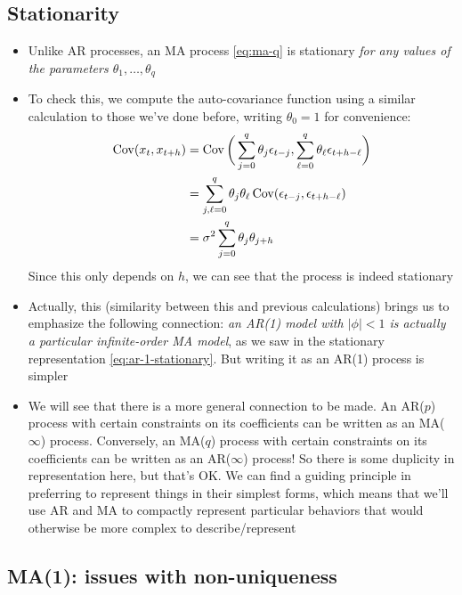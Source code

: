 \documentclass{article}
\begin{document}
\subsection{Stationarity}

\begin{itemize}
\item Unlike AR processes, an MA process \eqref{eq:ma-q} is stationary \emph{for
    any values of the parameters $\theta_1,\dots,\theta_q$}

\item To check this, we compute the auto-covariance function using a similar
  calculation to those we've done before, writing $\theta_0 = 1$ for
  convenience:  
  \begin{align}
  \nonumber
  \operatorname{Cov}(x_t, x_{t+h}) &= \operatorname{Cov}\bigg( \sum_{j=0}^q \theta_j \epsilon_{t-j}, 
  \sum_{\ell=0}^q \theta_\ell \epsilon_{t+h-\ell} \bigg) \\
  \nonumber
  &= \sum_{j,\ell=0}^q \theta_j \theta_\ell \operatorname{Cov}( \epsilon_{t-j},
    \epsilon_{t+h-\ell} ) \\
  \label{eq:ma-q-auto-cov}
  &= \sigma^2 \sum_{j=0}^q \theta_j \theta_{j+h}
  \end{align}
  Since this only depends on $h$, we can see that the process is indeed
  stationary 

\item Actually, this (similarity between this and previous calculations) brings
  us to emphasize the following connection: \emph{an AR(1) model with $|\phi| <
    1$ is actually a particular infinite-order MA model}, as we saw in the
  stationary representation \eqref{eq:ar-1-stationary}. But writing it as an
  AR(1) process is simpler   

\item We will see that there is a more general connection to be made. An AR($p$)
  process with certain constraints on its coefficients can be written as an
  MA($\infty$) process. Conversely, an MA($q$) process with certain constraints
  on its coefficients can be written as an AR($\infty$) process! So there is
  some duplicity in representation here, but that's OK. We can find a guiding
  principle in preferring to represent things in their simplest forms, which
  means that we'll use AR and MA to compactly represent particular behaviors
  that would otherwise be more complex to describe/represent
\end{itemize}

\subsection{MA(1): issues with non-uniqueness}
\end{document}
